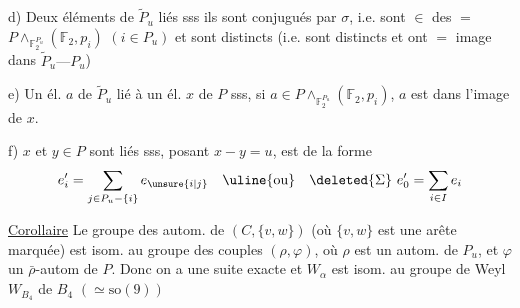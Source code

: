 d) Deux éléments de $\widetilde P_u$ liés sss ils sont conjugués par $\sigma$, i.e.   sont $\in$ des $=$  $P\wedge_{\mathbb F_2^{P_u}}(\mathbb F_2,p_i)$ $(i\in P_u)$ et sont distincts (i.e. sont distincts et ont $=$ image dans $\widetilde P_u\text{---}P_u$)

e)  Un él. $a$ de $\widetilde P_u$ lié à un él. $x$ de $P$ sss, si $a\in P\wedge_{\mathbb F_2^{P_u}}(\mathbb F_2,p_i)$, $a$ est dans l'image de $x$.

f) $x$ et $y\in P$ sont liés sss, posant $x-y=u$,  est de la forme 
\[
e'_i=\sum_{j\in P_u-\{i\}}e_{\unsure{i|j}}\quad\text{\uline{ou}}\quad\deleted{\Sigma}\ e'_0=\sum_{i\in I}e_i
\]

\noindent{}\uline{Corollaire} Le groupe des autom.  de $(C,\{v,w\})$ (où $\{v,w\}$ est une arête marquée) est isom. au groupe des couples $(\rho,\varphi)$, où $\rho$  est un autom. de  $P_u$, et $\varphi$ un $\bar\rho$-autom de $P$. Donc on a une suite exacte 
\noindent{}et $W_\alpha$ est isom. au groupe de Weyl $W_{B_4}$ de $B_4$ $(\simeq\mathrm{so}(9))$

